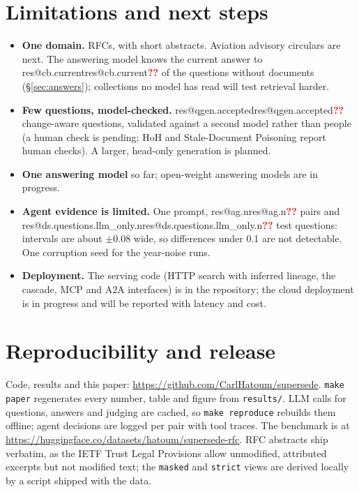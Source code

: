 \documentclass[11pt,a4paper]{article}
\makeatletter
\newcommand{\res}[1]{\ifcsname res@#1\endcsname\csname res@#1\endcsname\else\textcolor{red}{\textbf{??}}\fi}
\newcommand{\code}[1]{\texttt{\small #1}}
\makeatother
\begin{document}
\section{Limitations and next steps}
\begin{itemize}
\item \textbf{One domain.} RFCs, with short abstracts. Aviation advisory
  circulars are next. The answering model knows the current answer to
  \res{cb.current} of the questions without documents (§\ref{sec:answers});
  collections no model has read will test retrieval harder.
\item \textbf{Few questions, model-checked.} \res{qgen.accepted} change-aware
  questions, validated against a second model rather than people (a human check
  is pending; HoH and Stale-Document Poisoning report human checks). A larger,
  head-only generation is planned.
\item \textbf{One answering model} so far; open-weight answering models are in
  progress.
\item \textbf{Agent evidence is limited.} One prompt, \res{ag.n} pairs and
  \res{ds.questions.llm_only.n} test questions: intervals are about $\pm$0.08 wide,
  so differences under 0.1 are not detectable. One corruption seed for the
  year-noise runs.
\item \textbf{Deployment.} The serving code (HTTP search with inferred lineage, the
  cascade, MCP and A2A interfaces) is in the repository; the cloud deployment is in progress and
  will be reported with latency and cost.
\end{itemize}

\section{Reproducibility and release}\label{sec:repro}
Code, results and this paper: \url{https://github.com/CarlHatoum/supersede}.
\code{make paper} regenerates every number, table and figure from \code{results/}.
LLM calls for questions, answers and judging are cached, so \code{make reproduce}
rebuilds them offline; agent decisions are logged per pair with tool traces.
The benchmark is at \url{https://huggingface.co/datasets/hatoum/supersede-rfc}.
RFC abstracts ship verbatim, as the IETF Trust Legal Provisions allow unmodified,
attributed excerpts but not modified text; the \code{masked} and \code{strict} views
are derived locally by a script shipped with the data.

\clearpage
\appendix
\end{document}
